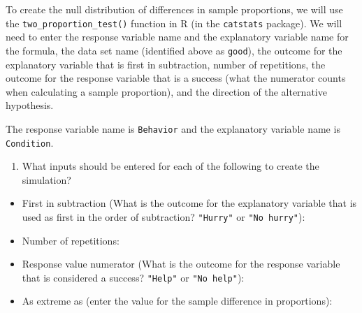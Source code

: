 \documentclass[
]{report}
\providecommand{\tightlist}{%
  \setlength{\itemsep}{0pt}\setlength{\parskip}{0pt}}
\begin{document}
\vspace{1in}

To create the null distribution of differences in sample proportions, we will use the \texttt{two\_proportion\_test()} function in R (in the \texttt{catstats} package). We will need to enter the response variable name and the explanatory variable name for the formula, the data set name (identified above as \texttt{good}), the outcome for the explanatory variable that is first in subtraction, number of repetitions, the outcome for the response variable that is a success (what the numerator counts when calculating a sample proportion), and the direction of the alternative hypothesis.

The response variable name is \texttt{Behavior} and the explanatory variable name is \texttt{Condition}.

\newpage

\begin{enumerate}
\def\labelenumi{\arabic{enumi}.}
\setcounter{enumi}{15}
\tightlist
\item
  What inputs should be entered for each of the following to create the simulation?
  \vspace{1mm}
\end{enumerate}

\begin{itemize}
\tightlist
\item
  First in subtraction (What is the outcome for the explanatory variable that is used as first in the order of subtraction? \texttt{"Hurry"} or \texttt{"No\ hurry"}):
\end{itemize}

\vspace{.15in}

\begin{itemize}
\tightlist
\item
  Number of repetitions:
\end{itemize}

\vspace{.15in}

\begin{itemize}
\tightlist
\item
  Response value numerator (What is the outcome for the response variable that is considered a success? \texttt{"Help"} or \texttt{"No\ help"}):
\end{itemize}

\vspace{.15in}

\begin{itemize}
\tightlist
\item
  As extreme as (enter the value for the sample difference in proportions):
\end{itemize}
\end{document}
